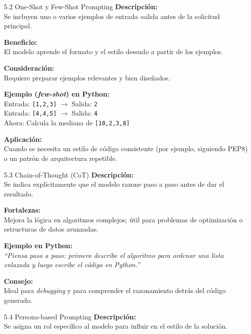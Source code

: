 \documentclass[xcolor=svgnames,t]{beamer}
\begin{document}
{%
\begin{frame}{5.2 One-Shot y Few-Shot Prompting}
\justifying
\textbf{Descripción:}\\
Se incluyen uno o varios ejemplos de entrada–salida antes de la solicitud principal.

\medskip
\textbf{Beneficio:}\\
El modelo aprende el formato y el estilo deseado a partir de los ejemplos.

\medskip
\textbf{Consideración:}\\
Requiere preparar ejemplos relevantes y bien diseñados.

\medskip
\textbf{Ejemplo (\textit{few-shot}) en Python:}\\
Entrada: \texttt{[1,2,3]} $\rightarrow$ Salida: \texttt{2}\\
Entrada: \texttt{[4,4,5]} $\rightarrow$ Salida: \texttt{4}\\
Ahora: Calcula la mediana de \texttt{[10,2,3,8]}

\medskip
\textbf{Aplicación:}\\
Cuando se necesita un estilo de código consistente (por ejemplo, siguiendo PEP8) o un patrón de arquitectura repetible.
\end{frame}

\begin{frame}{5.3 Chain-of-Thought (CoT)}
\justifying
\textbf{Descripción:}\\
Se indica explícitamente que el modelo razone paso a paso antes de dar el resultado.

\medskip
\textbf{Fortalezas:}\\
Mejora la lógica en algoritmos complejos; útil para problemas de optimización o estructuras de datos avanzadas.

\medskip
\textbf{Ejemplo en Python:}\\
\textit{“Piensa paso a paso: primero describe el algoritmo para ordenar una lista enlazada y luego escribe el código en Python.”}

\medskip
\textbf{Consejo:}\\
Ideal para \textit{debugging} y para comprender el razonamiento detrás del código generado.
\end{frame}
\begin{frame}{5.4 Persona-based Prompting}
\justifying
\textbf{Descripción:}\\
Se asigna un rol específico al modelo para influir en el estilo de la solución.


\end{frame}}
\end{document}
